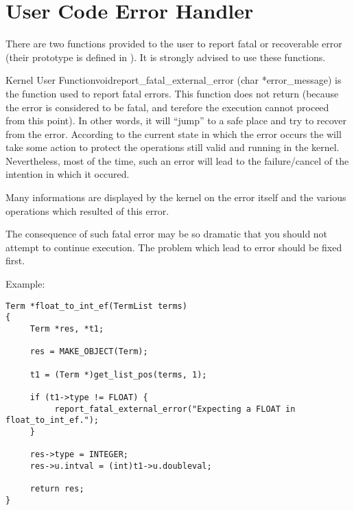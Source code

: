 \section{User Code Error Handler}

There are two functions provided to the user to report fatal or recoverable
error (their prototype is defined in ). It is strongly
advised to use these functions.

\begin{typefn}{Kernel User Function}{void}{report\_fatal\_external\_error} {(char *error\_message)}
is the function used to report fatal errors. This function does not return
(because the error is considered to be fatal, and terefore the execution cannot
proceed from this point). In other words, it will ``jump'' to a safe place and
try to recover from the error.  According to the current state in which the
error occurs the \CPK{} will take some action to protect the operations still
valid and running in the kernel. Nevertheless, most of the time, such an error
will lead to the failure/cancel of the intention in which it occured.

Many informations are displayed by the kernel on the error itself and the
various operations which resulted of this error. 

The consequence of such fatal error may be so dramatic that you should
not attempt to continue execution. The problem which lead to error should be
fixed first.

Example:
\begin{verbatim}
Term *float_to_int_ef(TermList terms)
{
     Term *res, *t1;

     res = MAKE_OBJECT(Term);

     t1 = (Term *)get_list_pos(terms, 1);

     if (t1->type != FLOAT) {
          report_fatal_external_error("Expecting a FLOAT in float_to_int_ef.");
     }

     res->type = INTEGER;
     res->u.intval = (int)t1->u.doubleval;

     return res;
}
\end{verbatim}
\end{typefn}

